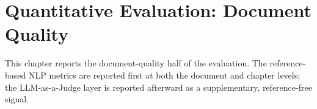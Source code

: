\chapter{Quantitative Evaluation: Document Quality}
\label{ch:docquality}

This chapter reports the document-quality half of the evaluation.
The reference-based NLP metrics are reported first at both the
document and chapter levels; the LLM-as-a-Judge layer is reported
afterward as a supplementary, reference-free signal.




